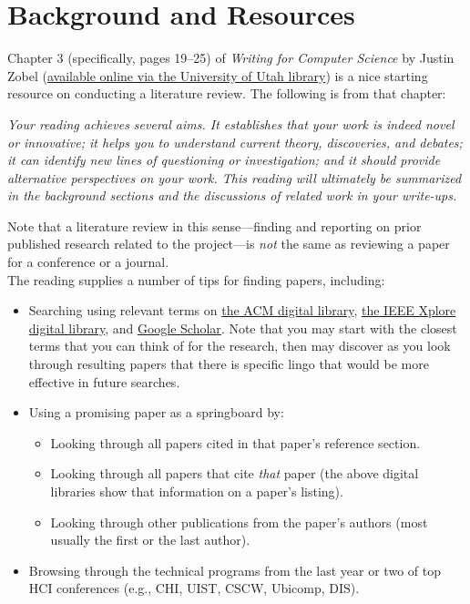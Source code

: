 \documentclass{article}
\begin{document}
\section{Background and Resources}
Chapter 3 (specifically, pages 19--25) of \textit{Writing for Computer Science} by Justin Zobel (\href{https://ebookcentral-proquest-com.ezproxy.lib.utah.edu/lib/utah/detail.action?docID=1974126}{available online via the University of Utah library}) is a nice starting resource on conducting a literature review. The following is from that chapter:

\begin{displayquote}
\textit{Your reading achieves several aims. It establishes that your work is indeed novel or innovative; it helps you to understand current theory, discoveries, and debates; it can identify new lines of questioning or investigation; and it should provide alternative perspectives on your work. This reading will ultimately be summarized in the background sections and the discussions of related work in your write-ups.}
\end{displayquote}

Note that a literature review in this sense---finding and reporting on prior published research related to the project---is \textit{not} the same as reviewing a paper for a conference or a journal.\\

The reading supplies a number of tips for finding papers, including:
\begin{itemize}
    \item Searching using relevant terms on \href{https://dl.acm.org/}{the ACM digital library}, \href{https://ieeexplore.ieee.org/Xplore/home.jsp}{the IEEE Xplore digital library}, and \href{https://scholar.google.com/}{Google Scholar}. Note that you may start with the closest terms that you can think of for the research, then may discover as you look through resulting papers that there is specific lingo that would be more effective in future searches.
    \item Using a promising paper as a springboard by:
    \begin{itemize}
        \item Looking through all papers cited in that paper's reference section.
        \item Looking through all papers that cite \textit{that} paper (the above digital libraries show that information on a paper's listing).
        \item Looking through other publications from the paper's authors (most usually the first or the last author).
    \end{itemize}
    \item Browsing through the technical programs from the last year or two of top HCI conferences (e.g., CHI, UIST, CSCW, Ubicomp, DIS).
\end{itemize}
\end{document}

